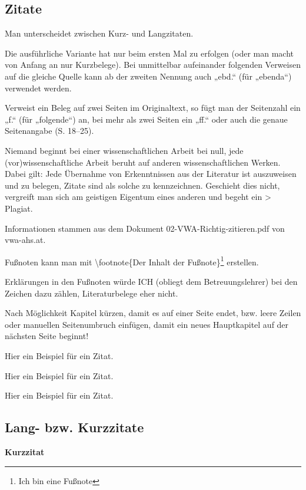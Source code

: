 \subsection{Zitate}
\label{subsec:zitate}

Man unterscheidet zwischen Kurz- und Langzitaten. 

Die ausführliche Variante hat nur beim ersten Mal zu erfolgen (oder man macht von Anfang an nur Kurzbelege).
Bei unmittelbar aufeinander folgenden Verweisen auf die gleiche Quelle kann ab der zweiten Nennung auch „ebd.“ (für „ebenda“) verwendet werden.

Verweist ein Beleg auf zwei Seiten im Originaltext, so fügt man der Seitenzahl ein „f.“ (für „folgende“) an, bei mehr als zwei Seiten ein „ff.“ oder auch die genaue Seitenangabe (S. 18–25).

Niemand beginnt bei einer wissenschaftlichen Arbeit bei null, jede (vor)wissenschaftliche Arbeit beruht auf anderen wissenschaftlichen Werken. Dabei gilt: Jede Übernahme von Erkenntnissen aus der Literatur ist auszuweisen und zu belegen, Zitate sind als solche zu kennzeichnen. Geschieht dies nicht, vergreift man sich am geistigen Eigentum eines anderen und begeht ein > Plagiat.

Informationen stammen aus dem Dokument 02-VWA-Richtig-zitieren.pdf von vwa-ahs.at.

Fußnoten kann man mit \textbackslash footnote\{Der Inhalt der Fußnote\}\footnote{Ich bin eine Fußnote} erstellen.

Erklärungen in den Fußnoten würde ICH (obliegt dem Betreuungslehrer) bei den Zeichen dazu zählen, Literaturbelege eher nicht.

Nach Möglichkeit Kapitel kürzen, damit es auf einer Seite endet, bzw. leere Zeilen oder manuellen Seitenumbruch einfügen, damit ein neues Hauptkapitel auf der nächsten Seite beginnt!

Hier ein Beispiel f\"ur ein Zitat. \autocite[8\psq]{bookEvOpt} %

Hier ein Beispiel f\"ur ein Zitat. \autocite[8\psqq]{bookEvOpt} %

Hier ein Beispiel f\"ur ein Zitat. \autocite[8]{bookEvOpt} %

\subsection{Lang- bzw. Kurzzitate}
\label{subsec:lang_kurz_zitate}

\textbf{Kurzzitat}

